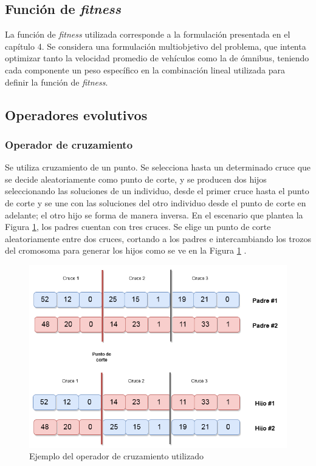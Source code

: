 \subsection{Función de \emph{fitness}}

La función de \emph{fitness} utilizada corresponde a la formulación presentada en el capítulo 4. Se considera una formulación multiobjetivo del problema, que intenta optimizar tanto la velocidad promedio de vehículos como la de ómnibus, teniendo cada componente un peso específico en la combinación lineal utilizada para definir la función de \emph{fitness}. 

\subsection{Operadores evolutivos}

\subsubsection{Operador de cruzamiento}
Se utiliza cruzamiento de un punto. Se selecciona hasta un determinado cruce que se decide aleatoriamente como punto de corte, y se producen dos hijos seleccionando las soluciones de un individuo, desde el primer cruce hasta el punto de corte y se une con las soluciones del otro individuo desde el punto de corte en adelante; el otro hijo se forma de manera inversa. En el escenario que plantea la Figura \ref{fig:op_cruzamiento}, los padres cuentan con tres cruces. Se elige un punto de corte aleatoriamente entre dos cruces, cortando a los padres e intercambiando los trozos del cromosoma para generar los hijos como se ve en la Figura \ref{fig:op_cruzamiento} . 

\begin{figure}[H]
	\centering
	\includegraphics[width=0.8\linewidth]{Figures/alg_cruzamiento}
	\caption{Ejemplo del operador de cruzamiento utilizado}
	\label{fig:op_cruzamiento}
\end{figure}



